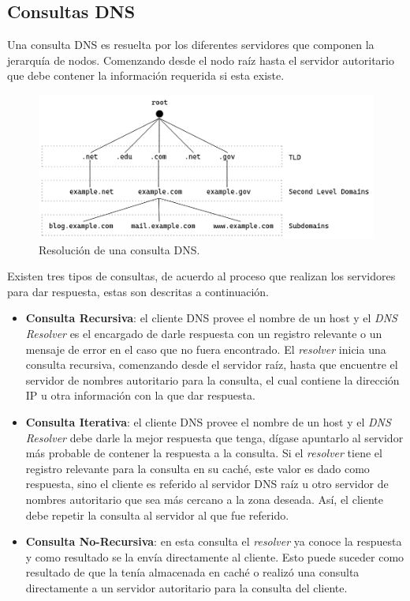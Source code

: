 \subsection{Consultas DNS}

Una consulta DNS es resuelta por los diferentes servidores que componen la jerarquía de nodos. Comenzando desde el nodo raíz hasta el servidor autoritario que debe contener la información requerida si esta existe.

\begin{figure}[!ht]
    \centering
    \includegraphics[width=\linewidth]{draws/dns-arch.png}
    \caption{Resolución de una consulta DNS.}
\end{figure}

Existen tres tipos de consultas, de acuerdo al proceso que realizan los servidores para dar respuesta, estas son descritas a continuación.

\begin{itemize}
    \item \textbf{Consulta Recursiva}: el cliente DNS provee el nombre de un host y el \textit{DNS Resolver} es el encargado de darle respuesta con un registro relevante o un mensaje de error en el caso que no fuera encontrado. El \textit{resolver} inicia una consulta recursiva, comenzando desde el servidor raíz, hasta que encuentre el servidor de nombres autoritario para la consulta, el cual contiene la dirección IP u otra información con la que dar respuesta. 
    
    \item \textbf{Consulta Iterativa}: el cliente DNS provee el nombre de un host y el \textit{DNS Resolver} debe darle la mejor respuesta que tenga, dígase apuntarlo al servidor más probable de contener la respuesta a la consulta. Si el \textit{resolver} tiene el registro relevante para la consulta en su caché, este valor es dado como respuesta, sino el cliente es referido al servidor DNS raíz u otro servidor de nombres autoritario que sea más cercano a la zona deseada. Así, el cliente debe repetir la consulta al servidor al que fue referido.
    
    \item \textbf{Consulta No-Recursiva}: en esta consulta el \textit{resolver} ya conoce la respuesta y como resultado se la envía directamente al cliente. Esto puede suceder como resultado de que la tenía almacenada en caché o realizó una consulta directamente a un servidor autoritario para la consulta del cliente.
\end{itemize}


